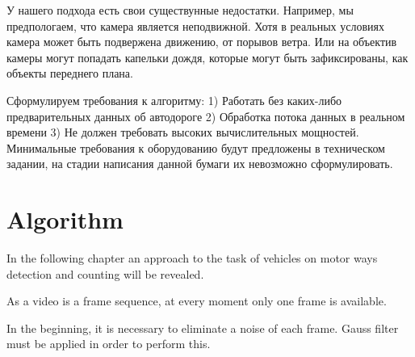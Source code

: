 \documentclass[12pt,a4paper,oneside,titlepage]{article}
\begin{document}
У нашего подхода есть свои существунные недостатки.
Например, мы предпологаем, что камера является неподвижной.
Хотя в реальных условиях камера может быть подвержена движению, от порывов ветра.
Или на объектив камеры могут попадать капельки дождя, которые могут быть зафиксированы, как объекты переднего плана.



Сформулируем требования к алгоритму:
1) Работать без каких-либо предварительных данных об автодороге
2) Обработка потока данных в реальном времени
3) Не должен требовать высоких вычислительных мощностей. Минимальные требования к оборудованию будут предложены в техническом задании, на стадии написания данной бумаги их невозможно сформулировать.
































\newpage
\section{Algorithm}



In the following chapter an approach to the task of vehicles on motor ways detection and counting will be revealed.

As a video is a frame sequence, at every moment only one frame is available.

In the beginning, it is necessary to eliminate a noise of each frame.
Gauss filter must be applied in order to perform this.
\end{document}
